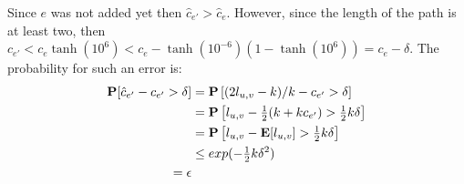 \documentclass[11pt]{article} \usepackage{amssymb}
\newcommand{\E}{{\bf E}} \newcommand{\Cov}{{\bf Cov}}
\newcommand{\eps}{\epsilon} \newcommand{\lam}{\lambda}
\newcommand{\half}{{\textstyle \frac12}}
\begin{document}
\begin{itemize}
  Since $e$ was not added yet then
  $\hat{c}_{e'}>\hat{c}_{e}$. However, since the length of the path is
  at least two, then
  $c_{e'}<c_{e}\tanh(10^6)<c_e-\tanh(10^{-6})(1-\tanh(10^6))=c_e-\delta$.  
  The probability for such an error is:
  \begin{align*}
    \P[\hat{c}_{e'}-c_{e'}>\delta] &= \P\left[(2l_{u,v}-k)/k-c_{e'}>\delta\right]
    \\ &= \P\left[l_{u,v}-\half(k+kc_{e'})>\half k\delta\right]
    \\ &= \P\left[l_{u,v}-\E[l_{u,v}]>\half k\delta\right]
    \\ &\leq exp(-\half k\delta^2)
    \\ = \eps
  \end{align*}
\end{itemize}
\end{document}
